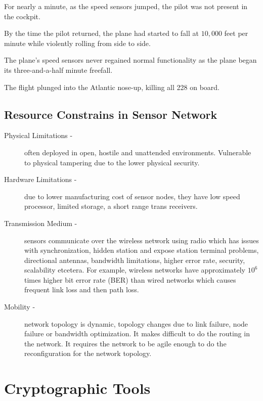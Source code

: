 \documentclass[%
  slidesonly,%
  semlayer%
  ]{seminar}                                  %
\begin{document}
\begin{slide}
      For nearly a minute, as the speed sensors jumped, the pilot was not present in the cockpit. 
      
      By the time the pilot returned, the plane had started to fall at $10,000$ feet per minute while violently rolling from side to side.
      
      The plane's speed sensors never regained normal functionality as the plane began its three-and-a-half minute freefall.
      
      The flight plunged into the Atlantic nose-up, killing all 228 on board.
      
      \clearpage

  \subsection*{Resource Constrains in Sensor Network}
    \begin{description}
      \item[Physical Limitations -] often deployed in open, hostile and unattended environments. Vulnerable to physical tampering due to the lower physical security.

      \item[Hardware Limitations -] due to lower manufacturing cost of sensor nodes, they have low speed processor, limited storage, a short range trans receivers.

      \item[Transmission Medium -] sensors communicate over the wireless network using radio which has issues with synchronization, hidden station and expose station terminal problems, directional antennas, bandwidth limitations, higher error rate, security, scalability etcetera.
      For example, wireless networks have approximately $10^6$ times higher bit error rate (BER) than wired networks which causes frequent link loss and then path loss.

      \item[Mobility -] network topology is dynamic, topology changes due to link failure, node failure or bandwidth optimization.
      It makes difficult to do the routing in the network.
      It requires the network to be agile enough to do the reconfiguration for the network topology. 
    \end{description}

    \clearpage

\section*{Cryptographic Tools}
  

\end{slide}
\end{document}
